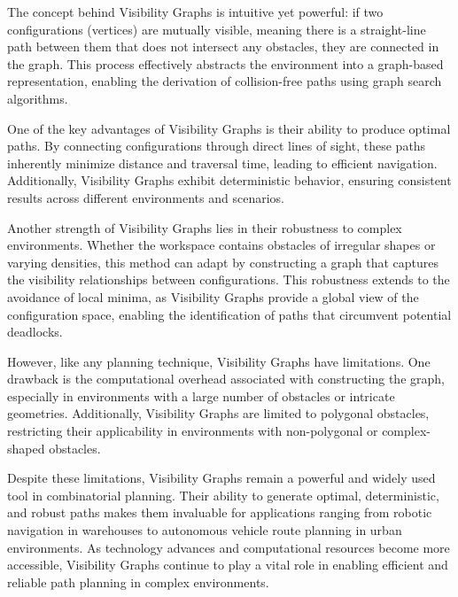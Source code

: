 \vspace*{6mm}


The concept behind Visibility Graphs is intuitive yet powerful: if two configurations (vertices) are mutually visible, meaning there is a straight-line path between them that does not intersect any obstacles, they are connected in the graph. This process effectively abstracts the environment into a graph-based representation, enabling the derivation of collision-free paths using graph search algorithms.

\vspace*{6mm}


One of the key advantages of Visibility Graphs is their ability to produce optimal paths. By connecting configurations through direct lines of sight, these paths inherently minimize distance and traversal time, leading to efficient navigation. Additionally, Visibility Graphs exhibit deterministic behavior, ensuring consistent results across different environments and scenarios.

\vspace*{6mm}


Another strength of Visibility Graphs lies in their robustness to complex environments. Whether the workspace contains obstacles of irregular shapes or varying densities, this method can adapt by constructing a graph that captures the visibility relationships between configurations. This robustness extends to the avoidance of local minima, as Visibility Graphs provide a global view of the configuration space, enabling the identification of paths that circumvent potential deadlocks.

\vspace*{6mm}


However, like any planning technique, Visibility Graphs have limitations. One drawback is the computational overhead associated with constructing the graph, especially in environments with a large number of obstacles or intricate geometries. Additionally, Visibility Graphs are limited to polygonal obstacles, restricting their applicability in environments with non-polygonal or complex-shaped obstacles.

\vspace*{6mm}


Despite these limitations, Visibility Graphs remain a powerful and widely used tool in combinatorial planning. Their ability to generate optimal, deterministic, and robust paths makes them invaluable for applications ranging from robotic navigation in warehouses to autonomous vehicle route planning in urban environments. As technology advances and computational resources become more accessible, Visibility Graphs continue to play a vital role in enabling efficient and reliable path planning in complex environments.


